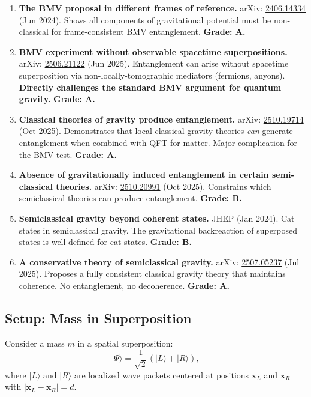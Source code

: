 \documentclass[11pt,a4paper]{article}
\begin{document}
\begin{enumerate}
\item \textbf{The BMV proposal in different frames of reference.} arXiv: \href{https://arxiv.org/abs/2406.14334}{2406.14334} (Jun 2024). Shows all components of gravitational potential must be non-classical for frame-consistent BMV entanglement. \textbf{Grade: A.}

\item \textbf{BMV experiment without observable spacetime superpositions.} arXiv: \href{https://arxiv.org/abs/2506.21122}{2506.21122} (Jun 2025). Entanglement can arise without spacetime superposition via non-locally-tomographic mediators (fermions, anyons). \textbf{Directly challenges the standard BMV argument for quantum gravity.} \textbf{Grade: A.}

\item \textbf{Classical theories of gravity produce entanglement.} arXiv: \href{https://arxiv.org/abs/2510.19714}{2510.19714} (Oct 2025). Demonstrates that local classical gravity theories \emph{can} generate entanglement when combined with QFT for matter. Major complication for the BMV test. \textbf{Grade: A.}

\item \textbf{Absence of gravitationally induced entanglement in certain semi-classical theories.} arXiv: \href{https://arxiv.org/abs/2510.20991}{2510.20991} (Oct 2025). Constrains which semiclassical theories can produce entanglement. \textbf{Grade: B.}

\item \textbf{Semiclassical gravity beyond coherent states.} JHEP (Jan 2024). Cat states in semiclassical gravity. The gravitational backreaction of superposed states is well-defined for cat states. \textbf{Grade: B.}

\item \textbf{A conservative theory of semiclassical gravity.} arXiv: \href{https://arxiv.org/abs/2507.05237}{2507.05237} (Jul 2025). Proposes a fully consistent classical gravity theory that maintains coherence. No entanglement, no decoherence. \textbf{Grade: A.}
\end{enumerate}

\subsection{Setup: Mass in Superposition}
\label{sec:superposition-setup}

Consider a mass $m$ in a spatial superposition:
\begin{equation}
|\Psi\rangle = \frac{1}{\sqrt{2}}\left(|L\rangle + |R\rangle\right),
\end{equation}
where $|L\rangle$ and $|R\rangle$ are localized wave packets centered at positions $\mathbf{x}_L$ and $\mathbf{x}_R$ with $|\mathbf{x}_L - \mathbf{x}_R| = d$.
\end{document}
